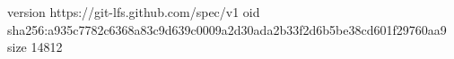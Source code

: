 version https://git-lfs.github.com/spec/v1
oid sha256:a935c7782c6368a83c9d639c0009a2d30ada2b33f2d6b5be38cd601f29760aa9
size 14812
